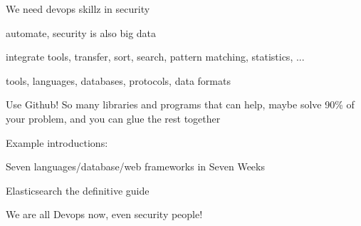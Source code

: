 \documentclass[Screen16to9,17pt]{foils}
\begin{document}

\begin{list1}
\item We need devops skillz in security
\item automate, security is also big data
\item integrate tools, transfer, sort, search, pattern matching, statistics, ...
\item tools, languages, databases, protocols, data formats
\item Use Github! So many libraries and programs that can help, maybe solve  90\% of your problem, and you can glue the rest together
\item Example introductions:
\begin{list2}
\item Seven languages/database/web frameworks in Seven Weeks
\item Elasticsearch the definitive guide
\end{list2}
\end{list1}

\centerline{We are all Devops now, even security people!}

\myquestionspage
\end{document}
